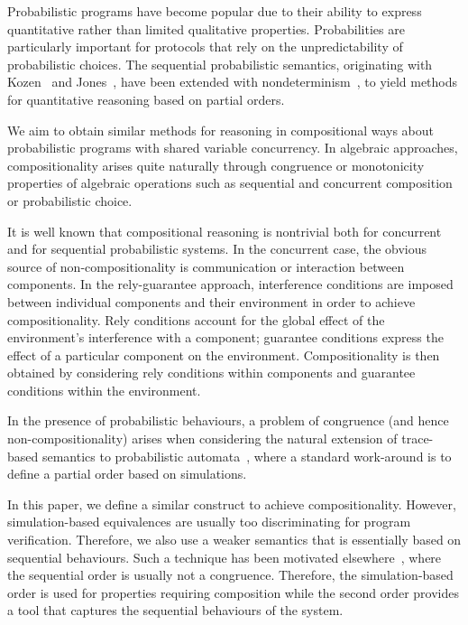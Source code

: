 \documentclass[review]{elsart}
\newcommand{\Gx}{\color{blue}}
\newcommand{\Tx}{\color{orange}}
\begin{document}
Probabilistic programs have become popular due to their ability to express quantitative rather than limited qualitative properties. Probabilities are particularly important for protocols that rely on the unpredictability of probabilistic choices.
The sequential probabilistic semantics, originating with Kozen~\cite{Koz81} and Jones~\cite{Jon92}, have been extended with nondeterminism~\cite{He97,Mci04}, to yield methods for quantitative reasoning based on partial orders. \todo[inline]{What does using partial orders mean? {\Tx Rewritten}} 

{\Gx
We aim to obtain similar methods for reasoning in compositional ways about probabilistic programs with shared variable concurrency. In algebraic approaches, compositionality arises quite naturally through congruence or monotonicity properties of algebraic operations such as sequential and concurrent composition or probabilistic choice.

It is well known that compositional reasoning is nontrivial both for concurrent and for sequential probabilistic systems.  In the concurrent case, the obvious source of non-compositionality is communication or interaction between components.  In the rely-guarantee approach, interference conditions are imposed between individual components and their environment in order to achieve compositionality. Rely conditions account for the global effect of the environment's interference with a component; guarantee conditions express the effect of a particular component on the environment.  Compositionality is then obtained by considering rely conditions within components and guarantee conditions within the environment.
}

In the presence of probabilistic behaviours, a problem of congruence (and hence non-compositionality) arises when considering the natural extension of trace-based semantics to probabilistic automata~\cite{Seg94}, where a standard work-around is to define a partial order based on simulations.


In this paper, we define a similar construct to achieve compositionality. However, simulation-based equivalences are usually too discriminating for program verification. Therefore, we also use a weaker semantics that is essentially based on sequential behaviours. Such a technique has been motivated elsewhere~\cite{Arm14}, where the sequential order is usually not a congruence. Therefore, the simulation-based order is used for properties requiring composition while the second order provides a tool that captures the sequential behaviours of the system.
\end{document}

